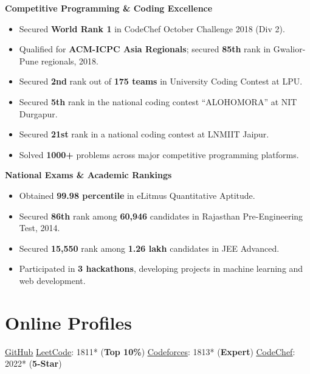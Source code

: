 \documentclass[10pt,a4paper]{article}
\newcommand{\achievementCategory}[1]{\par\vspace{4pt}\noindent\textbf{#1}\par\vspace{1.5pt}}
\newcommand{\resumeHref}[2]{\href{#1}{\uline{#2}}}
\begin{document}
\achievementCategory{Competitive Programming \& Coding Excellence}
{\small
\begin{itemize}[leftmargin=0.30in,itemsep=1.5pt,topsep=2pt]
  \item Secured \textbf{World Rank 1} in CodeChef October Challenge 2018 (Div 2).
  \item Qualified for \textbf{ACM-ICPC Asia Regionals}; secured \textbf{85th} rank in Gwalior-Pune regionals, 2018.
  \item Secured \textbf{2nd} rank out of \textbf{175 teams} in University Coding Contest at LPU.
  \item Secured \textbf{5th} rank in the national coding contest ``ALOHOMORA'' at NIT Durgapur.
  \item Secured \textbf{21st} rank in a national coding contest at LNMIIT Jaipur.
  \item Solved \textbf{1000+} problems across major competitive programming platforms.
\end{itemize}
}

\achievementCategory{National Exams \& Academic Rankings}
{\small
\begin{itemize}[leftmargin=0.30in,itemsep=1.5pt,topsep=2pt]
  \item Obtained \textbf{99.98 percentile} in eLitmus Quantitative Aptitude.
  \item Secured \textbf{86th} rank among \textbf{60,946} candidates in Rajasthan Pre-Engineering Test, 2014.
  \item Secured \textbf{15,550} rank among \textbf{1.26 lakh} candidates in JEE Advanced.
  \item Participated in \textbf{3 hackathons}, developing projects in machine learning and web development.
\end{itemize}
}
\vspace{2pt}

\section{Online Profiles}
\vspace{1pt}
{\small
\noindent\resumeHref{https://github.com/Maheshwari-Tech}{GitHub}
\hfill\textbar\hfill
\resumeHref{https://leetcode.com/u/snjumaheshwari/}{LeetCode}: 1811* (\textbf{Top 10\%})
\hfill\textbar\hfill
\resumeHref{https://codeforces.com/profile/snjumaheshwari98}{Codeforces}: 1813* (\textbf{Expert})
\hfill\textbar\hfill
\resumeHref{https://www.codechef.com/users/snjumaheshwari}{CodeChef}: 2022* (\textbf{5-Star})
}
\vspace{1pt}
\end{document}

